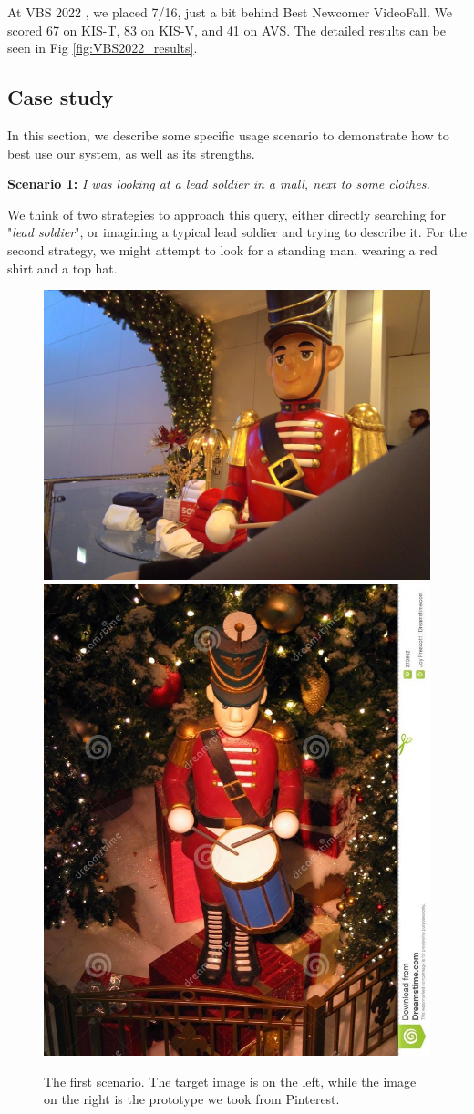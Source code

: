At VBS 2022 , we placed 7/16, just a bit behind Best Newcomer VideoFall. We scored 67 on KIS-T, 83 on KIS-V, and 41 on AVS. The detailed results can be seen in Fig \ref{fig:VBS2022_results}.

\subsection{Case study}
\label{sec:CaseStudy}




\vspace{2mm}

In this section, we describe some specific usage scenario to demonstrate how to best use our system, as well as its strengths.



\textbf{Scenario 1:} \textit{I was looking at a lead soldier in a mall, next to some clothes.}

We think of two strategies to approach this query, either directly searching for "\textit{lead soldier}", or imagining a typical lead soldier and trying to describe it. For the second strategy, we might attempt to look for a standing man, wearing a red shirt and a top hat. 



\begin{figure}[h]
    \centering
    \includegraphics[width=0.7\columnwidth]{content/resources/images/methods/CaseStudy1Target.jpg}
    \includegraphics[width=0.25\columnwidth]{content/resources/images/methods/CaseStudy1Prototype.jpg}
    \caption{The first scenario. The target image is on the left, while the image on the right is the prototype we took from Pinterest.}
    \label{fig:CaseStudy1}
\end{figure}

